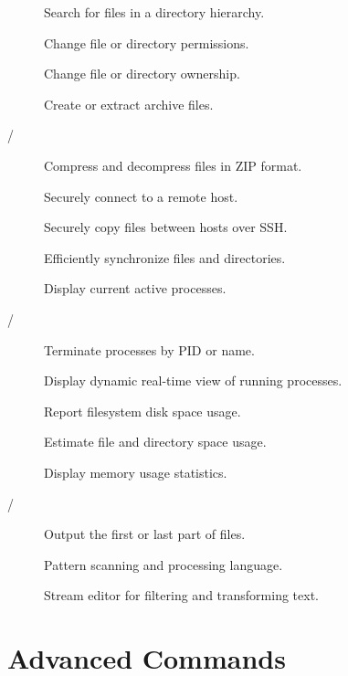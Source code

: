 \begin{description}
  \item[] Search for files in a directory hierarchy.
  \item[] Change file or directory permissions.
  \item[] Change file or directory ownership.
  \item[] Create or extract archive files.
  \item[/] Compress and decompress files in ZIP format.
  \item[] Securely connect to a remote host.
  \item[] Securely copy files between hosts over SSH.
  \item[] Efficiently synchronize files and directories.
  \item[] Display current active processes.
  \item[/] Terminate processes by PID or name.
  \item[] Display dynamic real-time view of running processes.
  \item[] Report filesystem disk space usage.
  \item[] Estimate file and directory space usage.
  \item[] Display memory usage statistics.
  \item[/] Output the first or last part of files.
  \item[] Pattern scanning and processing language.
  \item[] Stream editor for filtering and transforming text.
\end{description}

\section{Advanced Commands}

